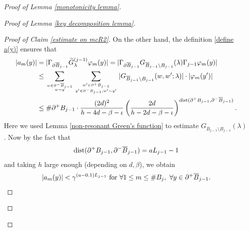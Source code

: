 \documentclass[11pt,reqno,UTF8,twoside]{amsart}
\newcommand{\barB}{\overline{B}}
\newcommand{\wtGjminusone}{\widetilde{G}^{(j-1)}}
\newcommand{\dist}{{\rm dist}}
\theoremstyle{definition}
\numberwithin{equation}{section}
\begin{document}
\begin{proof}[Proof of Lemma \ref{monotonicity lemma}]
\begin{proof}[Proof of Lemma \ref{key decomposition lemma}]
\begin{proof}[Proof of Claim \ref{estimate on mcR2}]
  On the other hand, the definition \eqref{define a(y)} ensures that 
  \begin{align*}
    |a_m(y)| & = |\Gamma_{\partial \barB_{j-1}}  \wtGjminusone_{\lambda} \varphi_m (y)| =| \Gamma_{\partial \barB_{j-1}} G_{\barB_{j-1}\setminus B_{j-1}}(\lambda)  \Gamma_{j-1} \varphi_m(y)| \\
       & \leq \sum_{w\in \partial^{-}\barB_{j-1} \atop  w\sim y} \sum_{w'\in \partial^+ B_{j-1} \atop y'\in \partial^-B_{j-1} , w' \sim y'}  |G_{\barB_{j-1}\setminus B_{j-1}}(w,w';\lambda)|\cdot |\varphi_m(y')| \\ 
       &\leq \#\partial^+ B_{j-1} \cdot \frac{(2d)^2}{h-4d-\beta-\iota} \left(\frac{2d}{h-2d-\beta-\iota}\right)^{\dist(\partial^+B_{j-1},\partial^-\barB_{j-1})}.
  \end{align*}
  Here we used Lemma \ref{non-resonant Green's function} to estimate $G_{\barB_{j-1}\setminus B_{j-1}}(\lambda)$. Now by the fact that  
  \[\dist(\partial^+B_{j-1},\partial^-\barB_{j-1}) =aL_{j-1}-1\]
  and taking $h$ large enough (depending on $d,\beta$), we obtain 
  \begin{equation}\label{decay of a(y)}
    |a_m(y)|<\gamma^{(a-0.1)L_{j-1}}\  {\rm for}\ \forall 1\leq m\leq \#B_j,\  \forall y\in \partial^+\barB_{j-1}.
  \end{equation}


\end{proof}
\end{proof}
\end{proof}
\end{document}
